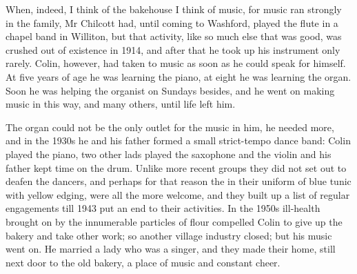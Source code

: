 When, indeed, I think of the bakehouse I think of music, for music ran strongly in the family, Mr Chilcott had, until coming to Washford, played the flute in a chapel band in Williton, but that activity, like so much else that was good, was crushed out of existence in 1914, and after that he took up his instrument only rarely. Colin, however, had taken to music as soon as he could speak for himself. At five years of age he was learning the piano, at eight he was learning the organ. Soon he was helping the organist on Sundays besides, and he went on making music in this way, and many others, until life left him.

The organ could not be the only outlet for the music in him, he needed more, and in the 1930s he and his father formed a small strict-tempo dance band: Colin played the piano, two other lads played the saxophone and the violin and his father kept time on the drum. Unlike more recent groups they did not set out to deafen the dancers, and perhaps for that reason the  in their uniform of blue tunic with yellow edging, were all the more welcome, and they built up a list of regular engagements till 1943 put an end to their activities. In the 1950s ill-health brought on by the innumerable particles of flour compelled Colin to give up the bakery and take other work; so another village industry closed; but his music went on. He married a lady who was a singer, and they made their home, still next door to the old bakery, a place of music and constant cheer.
